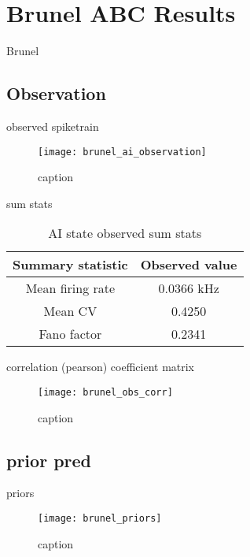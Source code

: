 \chapter{Brunel ABC Results}

Brunel 

\section{Observation}

observed spiketrain 

\begin{figure}[H]
    \centering
    \texttt{[image: brunel\_ai\_observation]}
    \caption{caption}
    \label{fig:fig1}
\end{figure}

sum stats

\begin{table}[H]
  \caption{AI state observed sum stats}
  \begin{center}
    \begin{tabular}{cc}
      \toprule
      \textbf{Summary statistic} & \textbf{Observed value} \\
      \midrule
      Mean firing rate &  0.0366 kHz \\
      Mean CV &  0.4250  \\
      Fano factor & 0.2341  \\
      \bottomrule
    \end{tabular}
  \end{center}
  \label{tab:hh_noisy_sumstats}
\end{table}

correlation (pearson) coefficient matrix

\begin{figure}[H]
    \centering
    \texttt{[image: brunel\_obs\_corr]}
    \caption{caption}
    \label{fig:fig1}
\end{figure}

\section{prior pred}

priors

\begin{figure}[H]
    \centering
    \texttt{[image: brunel\_priors]}
    \caption{caption}
    \label{fig:fig1}
\end{figure}

